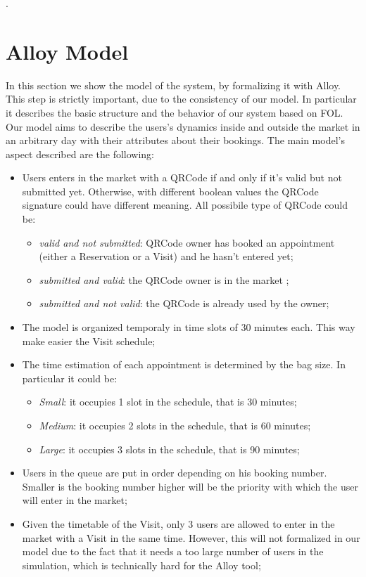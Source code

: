 \lstset{language=Alloy}.



\section{Alloy Model}
In this section we show the model of the system, by formalizing it with Alloy. This step is strictly important, due to the consistency of our model. 
In particular it describes the basic structure and the behavior of our system based on FOL.
Our model aims to describe the users's dynamics inside and outside the market in an arbitrary day with their attributes about their bookings.
The main model's aspect described are the following:

\begin{itemize}
\item Users enters in the market with a QRCode if and only if it's valid but not submitted yet. Otherwise, with different boolean values the QRCode signature could have different meaning. All possibile type of QRCode could be:
    \begin{itemize}
    \item \textit{valid and not submitted}: QRCode owner has booked an appointment (either a Reservation or a Visit) and he hasn't entered yet;
    \item \textit{submitted and valid}: the QRCode owner is in the market ;
    \item \textit{submitted and not valid}: the QRCode is already used by the owner;
    \end{itemize}
\item The model is organized temporaly in time slots of 30 minutes each. This way make easier the Visit schedule;
\item The time estimation of each appointment is determined by the bag size. In particular it could be:
\begin{itemize}
\item \textit{Small}: it occupies 1 slot in the schedule, that is 30 minutes;
\item \textit{Medium}: it occupies 2 slots in the schedule, that is 60 minutes;
\item \textit{Large}: it occupies 3 slots in the schedule, that is 90 minutes;
\end{itemize}

\item Users in the queue are put in order depending on his booking number. Smaller is  the booking number higher will be the priority with which the user will enter in the market;

\item Given the timetable of the Visit, only 3 users are allowed to enter in the market with a Visit in the same time. However, this will not formalized in our model due to the fact that it needs a too large number of users in the simulation, which is technically hard for the Alloy tool;

\end{itemize}

